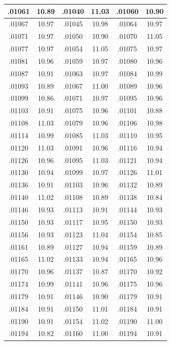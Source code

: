 \documentclass[11pt]{report}
\begin{document}
\begin{appendices}
\begin{longtable}{|c|c||c|c||c|c|}
.01061 & 10.89 & .01040 & 11.03 & .01060 & 10.90\\\hline
.01067 & 10.97 & .01045 & 10.98 & .01064 & 10.97\\\hline
.01071 & 10.97 & .01050 & 10.90 & .01070 & 11.05\\\hline
.01077 & 10.97 & .01054 & 11.05 & .01075 & 10.97\\\hline
.01081 & 10.96 & .01059 & 10.97 & .01080 & 10.96\\\hline
.01087 & 10.91 & .01063 & 10.97 & .01084 & 10.99\\\hline
.01093 & 10.89 & .01067 & 11.00 & .01089 & 10.96\\\hline
.01099 & 10.86 & .01071 & 10.97 & .01095 & 10.96\\\hline
.01103 & 10.91 & .01075 & 10.96 & .01101 & 10.88\\\hline
.01108 & 11.03 & .01079 & 10.96 & .01106 & 10.98\\\hline
.01114 & 10.99 & .01085 & 11.03 & .01110 & 10.95\\\hline
.01120 & 11.03 & .01091 & 10.96 & .01116 & 10.94\\\hline
.01126 & 10.96 & .01095 & 11.03 & .01121 & 10.94\\\hline
.01130 & 10.94 & .01099 & 10.97 & .01126 & 11.01\\\hline
.01136 & 10.91 & .01103 & 10.96 & .01132 & 10.89\\\hline
.01140 & 11.02 & .01108 & 10.89 & .01138 & 10.84\\\hline
.01146 & 10.93 & .01113 & 10.91 & .01144 & 10.93\\\hline
.01150 & 10.93 & .01117 & 10.95 & .01150 & 10.93\\\hline
.01156 & 10.93 & .01123 & 11.04 & .01154 & 10.85\\\hline
.01161 & 10.89 & .01127 & 10.94 & .01159 & 10.89\\\hline
.01165 & 11.02 & .01133 & 10.94 & .01165 & 10.96\\\hline
.01170 & 10.96 & .01137 & 10.87 & .01170 & 10.92\\\hline
.01174 & 10.99 & .01141 & 10.96 & .01175 & 10.96\\\hline
.01179 & 10.91 & .01146 & 10.90 & .01179 & 10.91\\\hline
.01184 & 10.91 & .01150 & 11.01 & .01184 & 10.91\\\hline
.01190 & 10.91 & .01154 & 11.02 & .01190 & 11.00\\\hline
.01194 & 10.82 & .01160 & 11.00 & .01194 & 10.91\\\hline

\end{longtable}
\end{appendices}
\end{document}
